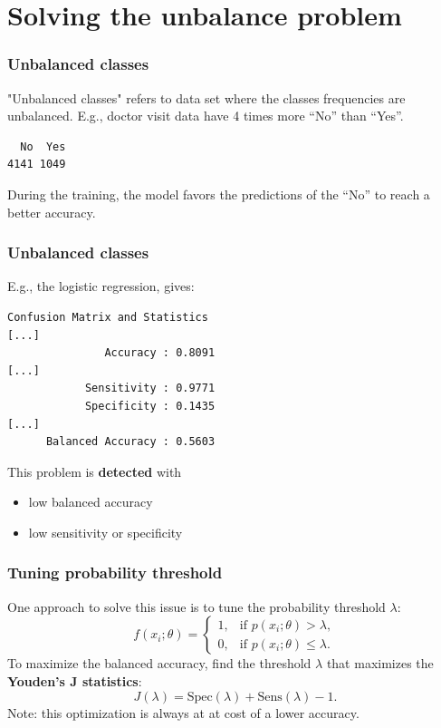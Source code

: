 \section{Solving the unbalance problem}
\begin{frame}[fragile]
\frametitle{Unbalanced classes}
"Unbalanced classes" refers to data set where the classes frequencies are unbalanced. E.g., doctor visit data have 4 times more ``No'' than ``Yes''.\\
\scriptsize
\begin{verbatim}
  No  Yes 
4141 1049
\end{verbatim}
\normalsize
During the training, the model favors the predictions of the ``No'' to reach a better accuracy. 
\end{frame}
\begin{frame}[fragile]
\frametitle{Unbalanced classes}
E.g., the logistic regression, gives:\\
\scriptsize
\begin{verbatim}
Confusion Matrix and Statistics
[...]
               Accuracy : 0.8091          
[...]                                          
            Sensitivity : 0.9771          
            Specificity : 0.1435          
[...]
      Balanced Accuracy : 0.5603
\end{verbatim}
\normalsize
This problem is {\bf detected} with
\begin{itemize}
\item low balanced accuracy
\item low sensitivity or specificity
\end{itemize}
\end{frame}
\begin{frame}
\frametitle{Tuning probability threshold}
One approach to solve this issue is to tune the probability threshold $\lambda$:
$$
f(x_i;\theta) = \left\{
\begin{array}{ll}
1, & \mbox{if } p(x_i;\theta) > \lambda,\\
0, & \mbox{if } p(x_i;\theta) \leq \lambda.
\end{array}
\right.
$$
To maximize the balanced accuracy, find the threshold $\lambda$ that maximizes the {\bf Youden's J statistics}:
$$
J(\lambda) = \mbox{Spec}(\lambda) + \mbox{Sens}(\lambda) - 1.
$$
Note: this optimization is always at at cost of a lower accuracy.
\end{frame}

